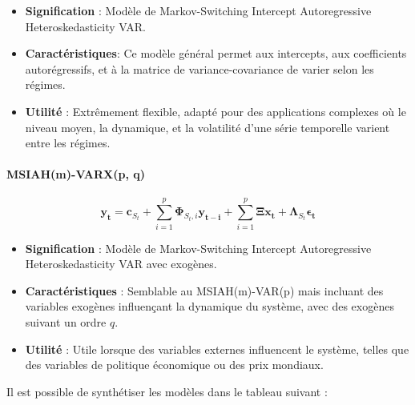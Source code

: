\begin{sloppypar}
\begin{itemize}
    \item \textbf{Signification} : Modèle de Markov-Switching Intercept Autoregressive Heteroskedasticity VAR.
    \item \textbf{Caractéristiques}: Ce modèle général permet aux intercepts, aux coefficients autorégressifs, et à la matrice de variance-covariance de varier selon les régimes.
    \item \textbf{Utilité} : Extrêmement flexible, adapté pour des applications complexes où le niveau moyen, la dynamique, et la volatilité d’une série temporelle varient entre les régimes.
\end{itemize}

\paragraph{MSIAH(m)-VARX(p, q)}

\begin{equation}
    \bm{y_t} = \bm{c}_{S_t} + \sum_{i=1}^{p} \bm{\Phi}_{S_t,i} \bm{y_{t-i}} + \sum_{i=1}^{p} \bm{\Xi} \bm{x_{t}} + \bm{\Lambda}_{S_t} \bm{\epsilon_t} 
\end{equation}

\begin{itemize}
    \item \textbf{Signification} : Modèle de Markov-Switching Intercept Autoregressive Heteroskedasticity VAR avec exogènes.
    \item \textbf{Caractéristiques} : Semblable au MSIAH(m)-VAR(p) mais incluant des variables exogènes influençant la dynamique du système, avec des exogènes suivant un ordre $q$.
    \item \textbf{Utilité} : Utile lorsque des variables externes influencent le système, telles que des variables de politique économique ou des prix mondiaux.
\end{itemize}

Il est possible de synthétiser les modèles dans le tableau suivant : 


\end{sloppypar}
